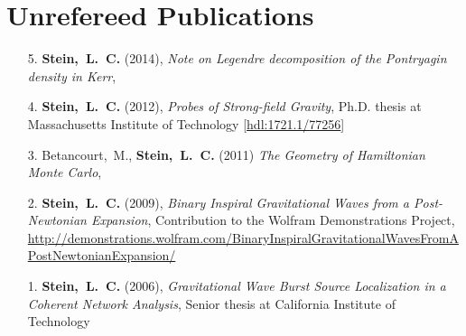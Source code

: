 \section{\sc Unrefereed Publications}
\begin{enumerate}
\item[{5.}] {\bf Stein,~L.~C.} (2014), {\it Note on Legendre decomposition of the Pontryagin density in Kerr},
\item[{4.}] {\bf Stein,~L.~C.} (2012), {\it Probes of Strong-field Gravity}, Ph.D. thesis at Massachusetts Institute of Technology
  [\href{http://hdl.handle.net/1721.1/77256}{hdl:1721.1/77256}]
\item[{3.}] Betancourt,~M., {\bf Stein,~L.~C.} (2011) {\it The
    Geometry of Hamiltonian Monte Carlo},
\item[{2.}] {\bf Stein,~L.~C.} (2009), {\it Binary Inspiral
    Gravitational Waves from a Post-Newtonian Expansion}, Contribution
  to the Wolfram Demonstrations Project, \url{http://demonstrations.wolfram.com/BinaryInspiralGravitationalWavesFromAPostNewtonianExpansion/}
\item[{1.}] {\bf Stein,~L.~C.} (2006), {\it Gravitational Wave Burst Source Localization in a Coherent Network Analysis}, Senior thesis at California Institute of Technology
\end{enumerate}


